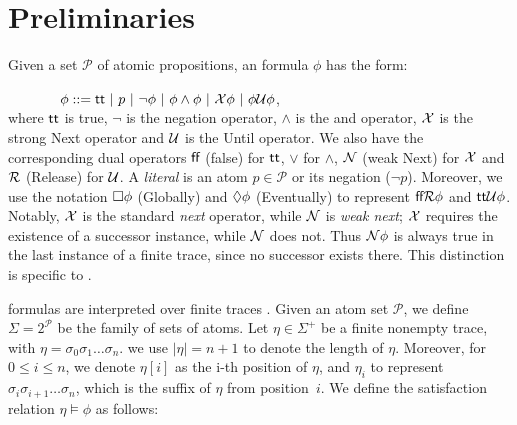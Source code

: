 

\section{Preliminaries}\label{sec:pre}
Given a set $\mathcal{P}$ of atomic propositions, an \ltlf formula
$\phi$ has the form:

$\ \ \ \ \ \ \ \ \ \ \ \phi ::= \true\ |\ p\ |\ \neg \phi\ |\ \phi\wedge\phi\ |\ \X\phi\ |\ \phi \U\phi$,\\
%
where $\textsf{tt}$ is true, $\neg$ is the negation operator, $\wedge$ is the and operator, $\mathcal{X}$ is the strong Next operator 
and  $\mathcal{U}$ is the Until operator. We also have the corresponding dual operators $\textsf{ff}$ (false) for $\textsf{tt}$, $\vee$ for $\wedge$, 
$\mathcal{N}$ (weak Next) for $\mathcal{X}$ and $\mathcal{R}$ (Release) for $\mathcal{U}$. A \emph{literal} is an atom $p\in\mathcal{P}$ or its negation ($\neg p$).
Moreover, we use the notation $\Box\phi$ (Globally) and $\Diamond\phi$ (Eventually) to represent $\textsf{ff} \mathcal{R}\phi$ and $\textsf{tt} \mathcal{U}\phi$.
Notably, $\mathcal{X}$ is the standard \emph{next} operator, while $\mathcal{N}$ is \emph{weak next}; 
$\mathcal{X}$ requires the existence of a successor instance, while $\mathcal{N}$ does not. 
Thus $\mathcal{N}\phi$ is always true in the last instance of a finite trace, since no successor exists there.
This distinction is specific to \ltlf.

\ltlf formulas are interpreted over finite traces \cite{GV13}.
Given an atom set $\mathcal{P}$, we define $\Sigma = 2^{\mathcal{P}}$ be  the family of sets of atoms. Let
$\eta\in\Sigma^+$ be a finite nonempty trace, with $\eta=\sigma_0\sigma_1\ldots\sigma_n$. we use
$|\eta|=n+1$ to denote the length of $\eta$. Moreover, for $0\leq
i\leq n$, we denote $\eta[i]$ as the i-th position of $\eta$, and 
$\eta_i$ to represent $\sigma_i\sigma_{i+1}\ldots\sigma_n$, which is
the suffix of $\eta$ from position~$i$. We define the satisfaction relation $\eta\models\phi$ as follows:

